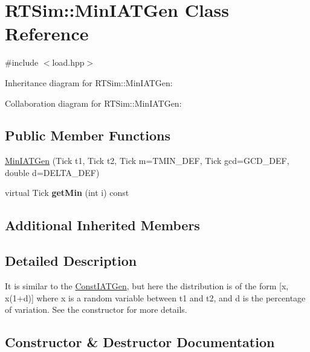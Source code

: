 \hypertarget{classRTSim_1_1MinIATGen}{}\section{R\+T\+Sim\+:\+:Min\+I\+A\+T\+Gen Class Reference}
\label{classRTSim_1_1MinIATGen}


{\ttfamily \#include $<$load.\+hpp$>$}



Inheritance diagram for R\+T\+Sim\+:\+:Min\+I\+A\+T\+Gen\+:


Collaboration diagram for R\+T\+Sim\+:\+:Min\+I\+A\+T\+Gen\+:
\subsection*{Public Member Functions}
\begin{DoxyCompactItemize}
\item 
\hyperlink{classRTSim_1_1MinIATGen_a2afd2981799edf95f9f45c59d6acf1de}{Min\+I\+A\+T\+Gen} (Tick t1, Tick t2, Tick m=T\+M\+I\+N\+\_\+\+D\+EF, Tick gcd=G\+C\+D\+\_\+\+D\+EF, double d=D\+E\+L\+T\+A\+\_\+\+D\+EF)
\item 
virtual Tick {\bfseries get\+Min} (int i) const \hypertarget{classRTSim_1_1MinIATGen_aa108eb8ed3921506c2e5b402bb2b405d}{}\label{classRTSim_1_1MinIATGen_aa108eb8ed3921506c2e5b402bb2b405d}

\end{DoxyCompactItemize}
\subsection*{Additional Inherited Members}


\subsection{Detailed Description}
It is similar to the \hyperlink{classRTSim_1_1ConstIATGen}{Const\+I\+A\+T\+Gen}, but here the distribution is of the form \mbox{[}x, x(1+d)\mbox{]} where x is a random variable between t1 and t2, and d is the percentage of variation. See the constructor for more details. 

\subsection{Constructor \& Destructor Documentation}
